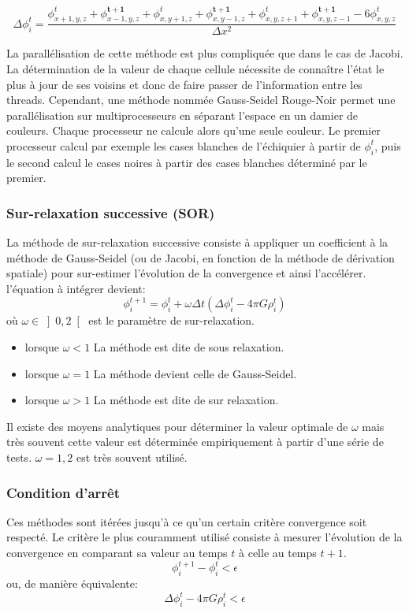 \[ \Delta \phi_i^t = \dfrac{\phi_{x+1,y,z}^t  + \phi_{x-1,y,z}^\mathbf{t+1} + \phi_{x,y+1,z}^t  + \phi_{x,y-1,z}^\mathbf{t+1} + \phi_{x,y,z+1}^t + \phi_{x,y,z-1}^\mathbf{t+1}	- 6\phi_{x,y,z}^t}{\Delta x ^2} \]

La parallélisation de cette méthode est plus compliquée que dans le cas de Jacobi. La détermination de la valeur de chaque cellule nécessite de connaître l'état le plus à jour de ses voisins et donc de faire passer de l'information entre les threads.
 Cependant, une méthode nommée Gauss-Seidel Rouge-Noir permet une parallélisation sur multiprocesseurs en séparant l'espace en un damier de couleurs. Chaque processeur ne calcule alors qu'une seule couleur. Le premier processeur calcul par exemple les cases blanches de l'échiquier à partir de $\phi_i^t$, puis le second calcul le cases noires à partir des cases blanches déterminé par le premier.


\subsubsection{Sur-relaxation successive (SOR)}
La méthode de sur-relaxation successive consiste à appliquer un coefficient à la méthode de Gauss-Seidel (ou de Jacobi, en fonction de la méthode de dérivation spatiale) pour sur-estimer l'évolution de la convergence et ainsi l'accélérer. l'équation à intégrer devient:
\[ \phi^{t+1}_i = \phi^{t}_i + \omega  \Delta t \left (\Delta \phi_i^t - 4 \pi G \rho^t_i \right )  \]
où $\omega \in \left] 0,2 \right [$ est le paramètre de sur-relaxation.
\begin{itemize}
\item lorsque $\omega <1$ La méthode est dite de sous relaxation.
\item lorsque $\omega =1$ La méthode devient celle de Gauss-Seidel.
\item lorsque $\omega >1$ La méthode est dite de sur relaxation.
\end{itemize}
Il existe des moyens analytiques pour déterminer la valeur optimale de $\omega$ mais très souvent cette valeur est déterminée empiriquement à partir d'une série de tests. $\omega = 1,2$ est très souvent utilisé.


\subsubsection{Condition d'arrêt}
Ces méthodes sont itérées jusqu’à ce qu'un certain critère convergence soit respecté. Le critère le plus couramment utilisé consiste à mesurer l'évolution de la convergence en comparant sa valeur au temps $t$ à celle au temps $t+1$.
\[ \phi^{t+1}_i - \phi^{t}_i < \epsilon \]
ou, de manière équivalente:
\[ \Delta \phi_i^t - 4 \pi G \rho^t_i< \epsilon \]

